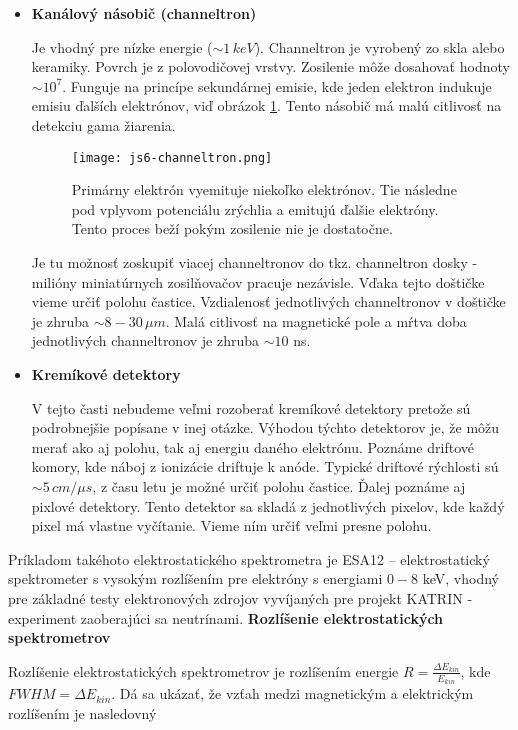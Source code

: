 \documentclass[../../main.tex]{subfiles}
\begin{document}
\begin{itemize}
\item \textbf{Kanálový násobič (channeltron)}\par 
Je vhodný pre nízke energie ($\sim 1\,keV$). Channeltron je vyrobený zo skla alebo keramiky. Povrch je z polovodičovej vrstvy. Zosilenie môže dosahovať hodnoty $\sim 10^7$. Funguje na princípe sekundárnej emisie, kde jeden elektron indukuje emisiu ďalších elektrónov, viď obrázok \ref{js6:fig:channeltron}. Tento násobič má malú citlivosť na detekciu gama žiarenia.
\begin{figure}[!h]
\centering
\texttt{[image: js6-channeltron.png]}
\caption{Primárny elektrón vyemituje niekoľko elektrónov. Tie následne pod vplyvom potenciálu zrýchlia a emitujú ďalšie elektróny. Tento proces beží pokým zosilenie nie je dostatočne.}
\label{js6:fig:channeltron}
\end{figure} \newline
Je tu možnosť zoskupiť viacej channeltronov do tkz. channeltron dosky - milióny miniatúrnych zosilňovačov pracuje nezávisle. Vďaka tejto doštičke vieme určiť polohu častice. Vzdialenosť jednotlivých channeltronov v doštičke je zhruba $\sim 8-30\,\mu m$. Malá citlivosť na magnetické pole a mŕtva doba jednotlivých channeltronov je zhruba $\sim 10$ ns.
\item \textbf{Kremíkové detektory}\par
V tejto časti nebudeme veľmi rozoberať kremíkové detektory pretože sú podrobnejšie popísane v inej otázke. Výhodou týchto detektorov je, že môžu merať ako aj polohu, tak aj energiu daného elektrónu. Poznáme driftové komory, kde náboj z ionizácie driftuje k anóde. Typické driftové rýchlosti sú $\sim 5\,cm/\mu s$, z času letu je možné určiť polohu častice. Ďalej poznáme aj pixlové detektory. Tento detektor sa skladá z jednotlivých pixelov, kde každý pixel má vlastne vyčítanie. Vieme ním určiť veľmi presne polohu. 
\end{itemize}
Príkladom takéhoto elektrostatického spektrometra je ESA12 – elektrostatický spektrometer s vysokým rozlíšením pre elektróny s energiami $0-8$ keV, vhodný pre základné testy elektronových zdrojov vyvíjaných pre projekt KATRIN - experiment zaoberajúci sa neutrínami.\newline
\textbf{Rozlíšenie elektrostatických spektrometrov}\par
Rozlíšenie elektrostatických spektrometrov je rozlíšením energie $R=\frac{\Delta E_{kin}}{E_{kin}}$, kde ${FWHM=\Delta E_{kin}}$. Dá sa ukázať, že vzťah medzi magnetickým a elektrickým rozlíšením je nasledovný 
\end{document}
